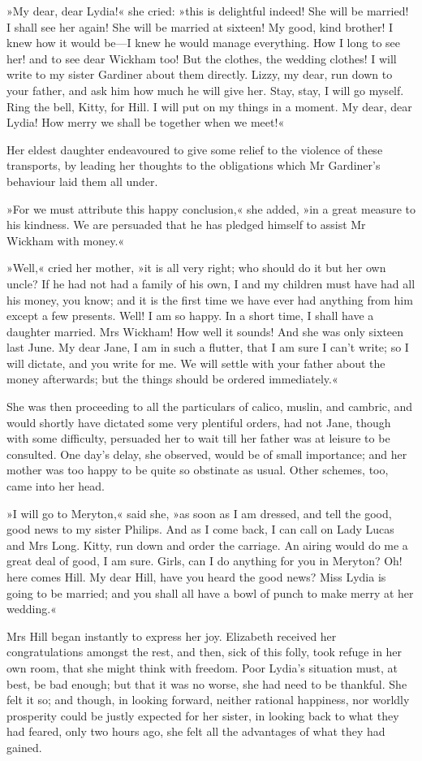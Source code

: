 »My dear, dear Lydia!« she cried: »this is delightful indeed! She will be married! I shall see her again! She will be married at sixteen! My good, kind brother! I knew how it would be—I knew he would manage everything. How I long to see her! and to see dear Wickham too! But the clothes, the wedding clothes! I will write to my sister Gardiner about them directly. Lizzy, my dear, run down to your father, and ask him how much he will give her. Stay, stay, I will go myself. Ring the bell, Kitty, for Hill. I will put on my things in a moment. My dear, dear Lydia! How merry we shall be together when we meet!«

Her eldest daughter endeavoured to give some relief to the violence of these transports, by leading her thoughts to the obligations which Mr Gardiner's behaviour laid them all under.

»For we must attribute this happy conclusion,« she added, »in a great measure to his kindness. We are persuaded that he has pledged himself to assist Mr Wickham with money.«

»Well,« cried her mother, »it is all very right; who should do it but her own uncle? If he had not had a family of his own, I and my children must have had all his money, you know; and it is the first time we have ever had anything from him except a few presents. Well! I am so happy. In a short time, I shall have a daughter married. Mrs Wickham! How well it sounds! And she was only sixteen last June. My dear Jane, I am in such a flutter, that I am sure I can't write; so I will dictate, and you write for me. We will settle with your father about the money afterwards; but the things should be ordered immediately.«

She was then proceeding to all the particulars of calico, muslin, and cambric, and would shortly have dictated some very plentiful orders, had not Jane, though with some difficulty, persuaded her to wait till her father was at leisure to be consulted. One day's delay, she observed, would be of small importance; and her mother was too happy to be quite so obstinate as usual. Other schemes, too, came into her head.

»I will go to Meryton,« said she, »as soon as I am dressed, and tell the good, good news to my sister Philips. And as I come back, I can call on Lady Lucas and Mrs Long. Kitty, run down and order the carriage. An airing would do me a great deal of good, I am sure. Girls, can I do anything for you in Meryton? Oh! here comes Hill. My dear Hill, have you heard the good news? Miss Lydia is going to be married; and you shall all have a bowl of punch to make merry at her wedding.«

Mrs Hill began instantly to express her joy. Elizabeth received her congratulations amongst the rest, and then, sick of this folly, took refuge in her own room, that she might think with freedom. Poor Lydia's situation must, at best, be bad enough; but that it was no worse, she had need to be thankful. She felt it so; and though, in looking forward, neither rational happiness, nor worldly prosperity could be justly expected for her sister, in looking back to what they had feared, only two hours ago, she felt all the advantages of what they had gained.